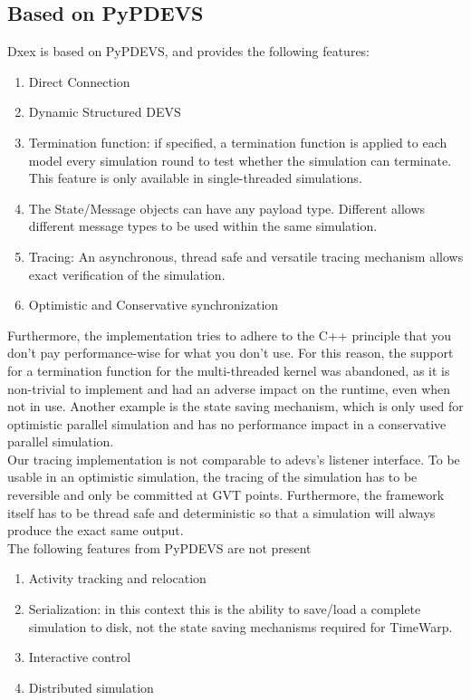 \subsection{Based on PyPDEVS}
Dxex is based on PyPDEVS, and provides the following features: 
\begin{enumerate}
	\item Direct Connection
	\item Dynamic Structured DEVS
	\item Termination function: if specified, a termination function is applied to each model every simulation round to test whether the simulation can terminate. This feature is only available in single-threaded simulations.
	\item The State/Message objects can have any payload type. Different allows different message types to be used within the same simulation.
	\item Tracing: An asynchronous, thread safe and versatile tracing mechanism allows exact verification of the simulation.
	\item Optimistic and Conservative synchronization
\end{enumerate}
Furthermore, the implementation tries to adhere to the C++ principle that you don't pay performance-wise for what you don't use. For this reason, the support for a termination function for the multi-threaded kernel was abandoned, as it is non-trivial to implement and had an adverse impact on the runtime, even when not in use. Another example is the state saving mechanism, which is only used for optimistic parallel simulation and has no performance impact in a conservative parallel simulation.\\
Our tracing implementation is not comparable to adevs's listener interface. To be usable in an optimistic simulation, the tracing of the simulation has to be reversible and only be committed at GVT points. Furthermore, the framework itself has to be thread safe and deterministic so that a simulation will always produce the exact same output.\\
The following features from PyPDEVS are not present
\begin{enumerate}
	\item Activity tracking and relocation
	\item Serialization: in this context this is the ability to save/load a complete simulation to disk, not the state saving mechanisms required for TimeWarp. 
	\item Interactive control
	\item Distributed simulation
\end{enumerate}
